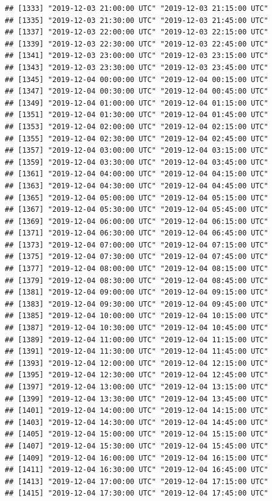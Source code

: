 \documentclass{article}\usepackage[]{graphicx}\usepackage[]{color}
\makeatletter
\newenvironment{kframe}{%
 \def\at@end@of@kframe{}%
 \ifinner\ifhmode%
  \def\at@end@of@kframe{\end{minipage}}%
  \begin{minipage}{\columnwidth}%
 \fi\fi%
 \def\FrameCommand##1{\hskip\@totalleftmargin \hskip-\fboxsep
 \colorbox{shadecolor}{##1}\hskip-\fboxsep
     \hskip-\linewidth \hskip-\@totalleftmargin \hskip\columnwidth}%
 \MakeFramed {\advance\hsize-\width
   \@totalleftmargin\z@ \linewidth\hsize
   \@setminipage}}%
 {\par\unskip\endMakeFramed%
 \at@end@of@kframe}
\newenvironment{knitrout}{}{} %
\makeatother
\begin{document}
\begin{knitrout}
\begin{kframe}
\begin{verbatim}
## [1333] "2019-12-03 21:00:00 UTC" "2019-12-03 21:15:00 UTC"
## [1335] "2019-12-03 21:30:00 UTC" "2019-12-03 21:45:00 UTC"
## [1337] "2019-12-03 22:00:00 UTC" "2019-12-03 22:15:00 UTC"
## [1339] "2019-12-03 22:30:00 UTC" "2019-12-03 22:45:00 UTC"
## [1341] "2019-12-03 23:00:00 UTC" "2019-12-03 23:15:00 UTC"
## [1343] "2019-12-03 23:30:00 UTC" "2019-12-03 23:45:00 UTC"
## [1345] "2019-12-04 00:00:00 UTC" "2019-12-04 00:15:00 UTC"
## [1347] "2019-12-04 00:30:00 UTC" "2019-12-04 00:45:00 UTC"
## [1349] "2019-12-04 01:00:00 UTC" "2019-12-04 01:15:00 UTC"
## [1351] "2019-12-04 01:30:00 UTC" "2019-12-04 01:45:00 UTC"
## [1353] "2019-12-04 02:00:00 UTC" "2019-12-04 02:15:00 UTC"
## [1355] "2019-12-04 02:30:00 UTC" "2019-12-04 02:45:00 UTC"
## [1357] "2019-12-04 03:00:00 UTC" "2019-12-04 03:15:00 UTC"
## [1359] "2019-12-04 03:30:00 UTC" "2019-12-04 03:45:00 UTC"
## [1361] "2019-12-04 04:00:00 UTC" "2019-12-04 04:15:00 UTC"
## [1363] "2019-12-04 04:30:00 UTC" "2019-12-04 04:45:00 UTC"
## [1365] "2019-12-04 05:00:00 UTC" "2019-12-04 05:15:00 UTC"
## [1367] "2019-12-04 05:30:00 UTC" "2019-12-04 05:45:00 UTC"
## [1369] "2019-12-04 06:00:00 UTC" "2019-12-04 06:15:00 UTC"
## [1371] "2019-12-04 06:30:00 UTC" "2019-12-04 06:45:00 UTC"
## [1373] "2019-12-04 07:00:00 UTC" "2019-12-04 07:15:00 UTC"
## [1375] "2019-12-04 07:30:00 UTC" "2019-12-04 07:45:00 UTC"
## [1377] "2019-12-04 08:00:00 UTC" "2019-12-04 08:15:00 UTC"
## [1379] "2019-12-04 08:30:00 UTC" "2019-12-04 08:45:00 UTC"
## [1381] "2019-12-04 09:00:00 UTC" "2019-12-04 09:15:00 UTC"
## [1383] "2019-12-04 09:30:00 UTC" "2019-12-04 09:45:00 UTC"
## [1385] "2019-12-04 10:00:00 UTC" "2019-12-04 10:15:00 UTC"
## [1387] "2019-12-04 10:30:00 UTC" "2019-12-04 10:45:00 UTC"
## [1389] "2019-12-04 11:00:00 UTC" "2019-12-04 11:15:00 UTC"
## [1391] "2019-12-04 11:30:00 UTC" "2019-12-04 11:45:00 UTC"
## [1393] "2019-12-04 12:00:00 UTC" "2019-12-04 12:15:00 UTC"
## [1395] "2019-12-04 12:30:00 UTC" "2019-12-04 12:45:00 UTC"
## [1397] "2019-12-04 13:00:00 UTC" "2019-12-04 13:15:00 UTC"
## [1399] "2019-12-04 13:30:00 UTC" "2019-12-04 13:45:00 UTC"
## [1401] "2019-12-04 14:00:00 UTC" "2019-12-04 14:15:00 UTC"
## [1403] "2019-12-04 14:30:00 UTC" "2019-12-04 14:45:00 UTC"
## [1405] "2019-12-04 15:00:00 UTC" "2019-12-04 15:15:00 UTC"
## [1407] "2019-12-04 15:30:00 UTC" "2019-12-04 15:45:00 UTC"
## [1409] "2019-12-04 16:00:00 UTC" "2019-12-04 16:15:00 UTC"
## [1411] "2019-12-04 16:30:00 UTC" "2019-12-04 16:45:00 UTC"
## [1413] "2019-12-04 17:00:00 UTC" "2019-12-04 17:15:00 UTC"
## [1415] "2019-12-04 17:30:00 UTC" "2019-12-04 17:45:00 UTC"

\end{verbatim}
\end{kframe}
\end{knitrout}
\end{document}
